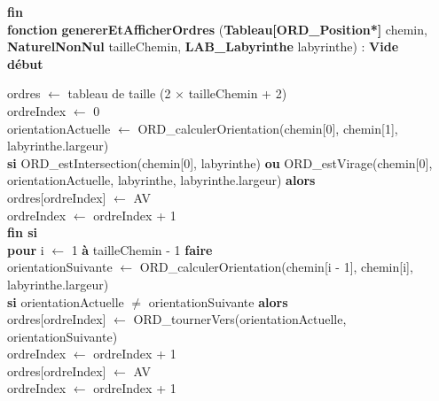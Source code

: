 \textbf{fin}\\

\noindent\textbf{fonction} \textbf{genererEtAfficherOrdres} (\textbf{Tableau[ORD\_Position*]} chemin, \textbf{NaturelNonNul} tailleChemin, \textbf{LAB\_Labyrinthe} labyrinthe) : \textbf{Vide}\\
\textbf{début}
\begin{flushleft}
    \hspace*{1cm}ordres $\gets$ tableau de taille (2 $\times$ tailleChemin + 2)\\
    \hspace*{1cm}ordreIndex $\gets$ 0\\
    \hspace*{1cm}orientationActuelle $\gets$ ORD\_calculerOrientation(chemin[0], chemin[1], labyrinthe.largeur)\\
    \hspace*{1cm}\textbf{si} ORD\_estIntersection(chemin[0], labyrinthe) \textbf{ou} ORD\_estVirage(chemin[0], orientationActuelle, labyrinthe, labyrinthe.largeur) \textbf{alors}\\
    \hspace*{2cm}ordres[ordreIndex] $\gets$ AV\\
    \hspace*{2cm}ordreIndex $\gets$ ordreIndex + 1\\
    \hspace*{1cm}\textbf{fin si}\\
    \hspace*{1cm}\textbf{pour} i $\gets$ 1 \textbf{à} tailleChemin - 1 \textbf{faire}\\
    \hspace*{2cm}orientationSuivante $\gets$ ORD\_calculerOrientation(chemin[i - 1], chemin[i], labyrinthe.largeur)\\
    \hspace*{2cm}\textbf{si} orientationActuelle $\neq$ orientationSuivante \textbf{alors}\\
    \hspace*{3cm}ordres[ordreIndex] $\gets$ ORD\_tournerVers(orientationActuelle, orientationSuivante)\\
    \hspace*{3cm}ordreIndex $\gets$ ordreIndex + 1\\
    \hspace*{3cm}ordres[ordreIndex] $\gets$ AV\\
    \hspace*{3cm}ordreIndex $\gets$ ordreIndex + 1\\

\end{flushleft}
